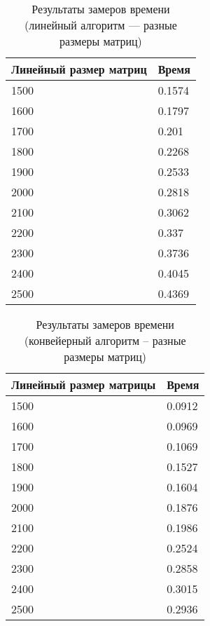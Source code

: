 \begin{table}[h]
	\begin{center}
		\begin{threeparttable}
			\captionsetup{justification=raggedright,singlelinecheck=off}
			\caption{Результаты замеров времени (линейный алгоритм --- разные размеры матриц)}
			\label{tbl:time_lin_size}
			\begin{tabular}{|p{6cm}|p{6cm}|}
				\hline
				Линейный размер матриц & Время \\
				\hline
				1500 & 0.1574 \\ \hline 
				1600 & 0.1797 \\ \hline 
				1700 & 0.201 \\ \hline 
				1800 & 0.2268 \\ \hline 
				1900 & 0.2533 \\ \hline 
				2000 & 0.2818 \\ \hline 
				2100 & 0.3062 \\ \hline 
				2200 & 0.337 \\ \hline 
				2300 & 0.3736 \\ \hline 
				2400 & 0.4045 \\ \hline 
				2500 & 0.4369 \\ \hline 
				
			\end{tabular}
		\end{threeparttable}
	\end{center}
\end{table}


\begin{table}[h]
	\begin{center}
		\begin{threeparttable}
			\captionsetup{justification=raggedright,singlelinecheck=off}
			\caption{Результаты замеров времени (конвейерный алгоритм -- разные размеры матриц)}
			\label{tbl:time_conv_size}
			\begin{tabular}{|p{6cm}|p{6cm}|}
				\hline
				Линейный размер матрицы & Время \\
				\hline 
				1500 & 0.0912 \\ \hline 
				1600 & 0.0969 \\ \hline 
				1700 & 0.1069 \\ \hline 
				1800 & 0.1527 \\ \hline 
				1900 & 0.1604 \\ \hline 
				2000 & 0.1876 \\ \hline 
				2100 & 0.1986 \\ \hline 
				2200 & 0.2524 \\ \hline 
				2300 & 0.2858 \\ \hline 
				2400 & 0.3015 \\ \hline 
				2500 & 0.2936 \\ \hline 
			\end{tabular}
		\end{threeparttable}
	\end{center}
\end{table}

